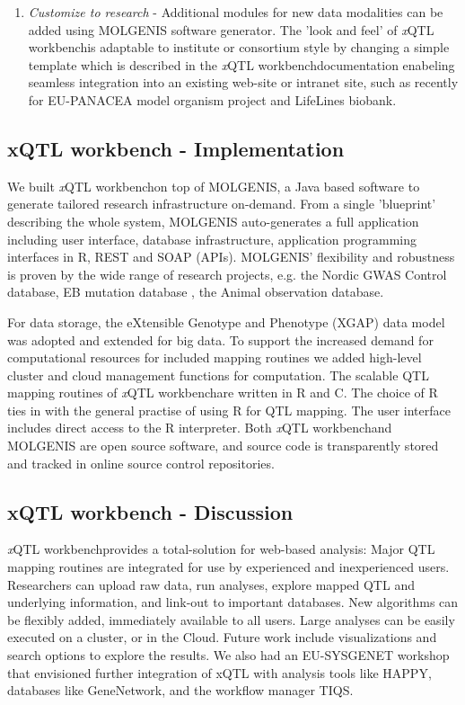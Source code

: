 \documentclass[8pt, twoside, a5paper]{report}
\newcommand{\italic}[1]{\textit{#1}}
\newcommand{\xqtlwb}{{\it x}QTL workbench}
\begin{document}
\begin{enumerate}
\item \italic{Customize to research} - Additional modules for new data modalities can be added using MOLGENIS software 
generator\cite{Swertz:2010b}. The 'look and feel' of \xqtlwb is adaptable to institute or consortium style by changing a 
simple template which is described in the \xqtlwb documentation enabeling seamless integration into an existing web-site
or intranet site, such as recently for EU-PANACEA model organism project and LifeLines biobank.
\end{enumerate}

\subsection{xQTL workbench - Implementation}

We built \xqtlwb on top of MOLGENIS\cite{Swertz:2004}, a Java based software to generate tailored research infrastructure 
on-demand\cite{Swertz:2007}. From a single 'blueprint' describing the whole system, MOLGENIS auto-generates a full 
application including user interface, database infrastructure, application programming interfaces in R, REST and SOAP 
(APIs). MOLGENIS' flexibility and robustness is proven by the wide range of research projects, e.g. the Nordic GWAS 
Control database\cite{Leu:2010}, EB mutation database \cite{Akker:2011}, the Animal observation database\cite{Swertz:2010b}.

For data storage, the eXtensible Genotype and Phenotype (XGAP) data model was adopted\cite{Swertz:2010a} and extended 
for big data. To support the increased demand for computational resources for included mapping routines we added high-level 
cluster and cloud management functions for computation. The scalable QTL mapping routines of \xqtlwb are written in R 
and C. The choice of R ties in with the general practise of using R for QTL mapping. The user interface includes direct 
access to the R interpreter.  Both \xqtlwb and MOLGENIS are open source software, and source code is transparently
stored and tracked in online source control repositories.

\subsection{xQTL workbench - Discussion}

\xqtlwb provides a total-solution for web-based analysis: Major QTL mapping routines are integrated for use by experienced 
and inexperienced users. Researchers can upload raw data, run analyses, explore mapped QTL and underlying information, and 
link-out to important databases. New algorithms can be flexibly added, immediately available to all users. Large analyses 
can be easily executed on a cluster, or in the Cloud. Future work include visualizations and search options to explore the 
results. We also had an EU-SYSGENET workshop that envisioned further integration of xQTL with analysis tools like HAPPY, 
databases like GeneNetwork, and the workflow manager TIQS\cite{Durrant:2012}.
\end{document}
